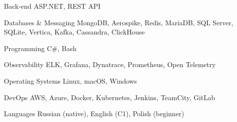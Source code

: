 

\begin{cvskills}

  \cvskill
    {Back-end} %
    {ASP.NET, REST API} %

  \cvskill
    {Databases \& Messaging} %
    {MongoDB, Aerospike, Redis, MariaDB, SQL Server, SQLite, Vertica, Kafka, Cassandra, ClickHouse} %

  \cvskill
    {Programming} %
    {C\#, Bash} %

  \cvskill
    {Observability} %
    {ELK, Grafana, Dynatrace, Prometheus, Open Telemetry} %

  \cvskill
    {Operating Systems} %
    {Linux, macOS, Windows} %

  \cvskill
    {DevOps} %
    {AWS, Azure, Docker, Kubernetes, Jenkins, TeamCity, GitLab} %

  \cvskill
    {Languages} %
    {Russian (native), English (C1), Polish (beginner)} %

\end{cvskills}
